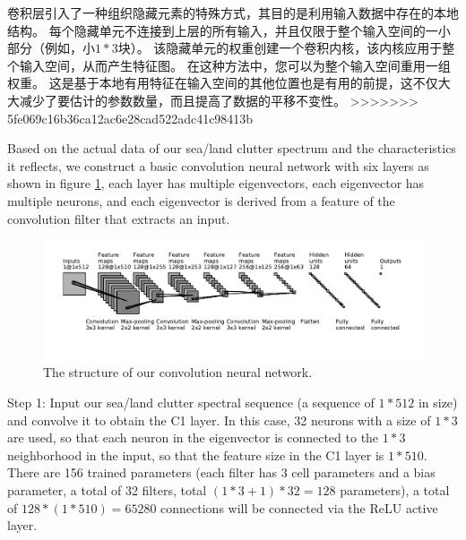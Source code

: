 
卷积层引入了一种组织隐藏元素的特殊方式，其目的是利用输入数据中存在的本地结构。 每个隐藏单元不连接到上层的所有输入，并且仅限于整个输入空间的一小部分（例如，小$ 1 * 3 $块）。 该隐藏单元的权重创建一个卷积内核，该内核应用于整个输入空间，从而产生特征图。 在这种方法中，您可以为整个输入空间重用一组权重。 这是基于本地有用特征在输入空间的其他位置也是有用的前提，这不仅大大减少了要估计的参数数量，而且提高了数据的平移不变性。
>>>>>>> 5fe069c16b36ca12ac6e28cad522adc41c98413b

Based on the actual data of our sea/land clutter spectrum and the characteristics it reflects, we construct a basic convolution neural network with six layers as shown in figure \ref{fig:struct}, each layer has multiple eigenvectors, each eigenvector has multiple neurons, and each eigenvector is derived from a feature of the convolution filter that extracts an input.
\begin{figure}[!t]
	\centering
	\includegraphics[width=7in]{figures/struct}
	\caption{The structure of our convolution neural network.}
	\label{fig:struct}
\end{figure}

Step 1: Input our sea/land clutter spectral sequence (a sequence of $1 * 512$ in size) and convolve it to obtain the C1 layer. In this case, 32 neurons with a size of $1 * 3$ are used, so that each neuron in the eigenvector is connected to the $1 * 3$ neighborhood in the input, so that the feature size in the C1 layer is $1 * 510$. There are 156 trained parameters (each filter has 3 cell parameters and a bias parameter, a total of 32 filters, total $(1 * 3 + 1) * 32 = 128$ parameters), a total of $128 * (1 * 510) = 65280$ connections will be connected via the ReLU active layer.

